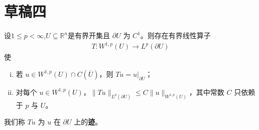 \documentclass[../../main.tex]{subfiles}%
\begin{document}
\section{草稿四}

\begin{theorem}[迹定理]\label{theorem:ch05-迹定理}
设$1\leqslant p<\infty$,$U\subseteq \mathbb{R}^n$是有界开集且 $\partial U$ 为 $C^{1}$。则存在有界线性算子
\begin{align*}
T:W^{1,p}(U)\to L^{p}(\partial U)
\end{align*}
使
\begin{enumerate}[(i)]
\item 若 $u\in W^{1,p}(U)\cap C(\overline{U})$，则 $Tu=u|_{\partial U}$；

\item 对每个 $u\in W^{1,p}(U)$，$\|Tu\|_{L^{p}(\partial U)}\leqslant C\|u\|_{W^{1,p}(U)}$，其中常数 $C$ 只依赖于 $p$ 与 $U$。
\end{enumerate}
我们称 $Tu$ 为 $u$ 在 $\partial U$ 上的\textbf{迹}。
\end{theorem}
\end{document}
